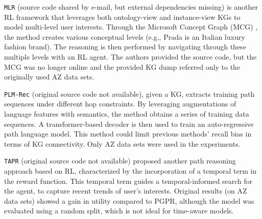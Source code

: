 \documentclass[runningheads]{llncs}
\begin{document}
\texttt{MLR} \cite{10.1145/3485447.3512083} (source code shared by e-mail, but external dependencies missing) 
is another RL framework that leverages both ontology-view and instance-view KGs to model multi-level user interests.
Through the Microsoft Concept Graph (MCG) \cite{10.1162/dint_a_00013}, 
the method creates various conceptual levels (e.g., Prada is an Italian luxury fashion brand). 
The reasoning is then performed by navigating through these multiple levels with an RL agent.
The authors provided the source code, but the MCG was no longer online and the provided KG dump referred only to the originally used AZ data sets. 

\texttt{PLM-Rec} \cite{10.1145/3485447.3511937}  (original source code not available), 
given a KG, extracts training path sequences under different hop constraints.
By leveraging augmentations of language features with semantics, the method obtains a series of training data sequences. 
A transformer-based decoder is then used to train an auto-regressive path language model.
This method could limit previous methods' recall bias in terms of KG connectivity. 
Only AZ data sets were used in the experiments. 

\texttt{TAPR} \cite{10.1145/3531267} (original source code not available)
proposed another path reasoning approach based on RL, characterized by the incorporation of a temporal term in the reward function. 
This temporal term guides a temporal-informed search for the agent, to capture recent trends of user's interests. 
Original results (on AZ data sets) showed a gain in utility compared to PGPR, although the model was evaluated using a random split, which is not ideal for time-aware models.
\end{document}
